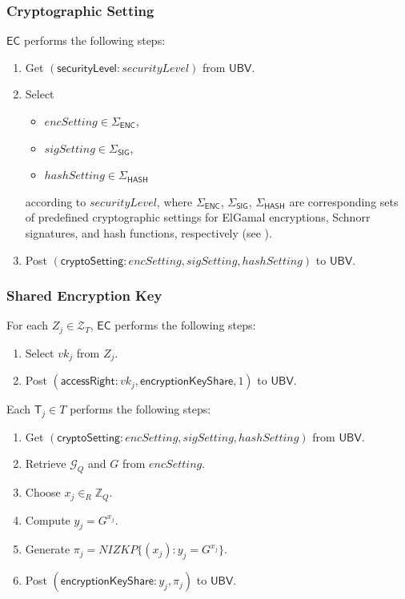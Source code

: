 \documentclass[bibtotoc,halfparskip,oneside]{scrreprt}
\newcommand{\security}{\mathit{securityLevel}\xspace}
\newcommand{\vk}[1]{\mathit{vk}_{#1}\xspace}
\newcommand{\EC}{\ensuremath{\mathsf{EC}}\xspace}
\newcommand{\UBV}{\ensuremath{\mathsf{UBV}}\xspace}
\newcommand{\Tallier}[1]{\ensuremath{\mathsf{T}_{#1}}\xspace}
\begin{document}
\subsubsection{Cryptographic Setting}

\EC performs the following steps:
\begin{enumerate}
	\item Get $(\mathsf{securityLevel}: \security)$ from \UBV.
	\item Select 
	\begin{itemize}
		\item $\mathit{encSetting}\in \Sigma_\mathsf{ENC}$, 
		\item $\mathit{sigSetting}\in \Sigma_\mathsf{SIG}$, 
		\item $\mathit{hashSetting}\in \Sigma_\mathsf{HASH}$ 
	\end{itemize}
	according to $\security$, where $\Sigma_\mathsf{ENC}$, $\Sigma_\mathsf{SIG}$, $\Sigma_\mathsf{HASH}$ are corresponding sets of predefined cryptographic settings for ElGamal encryptions, Schnorr signatures, and hash functions, respectively (see ).
	\item Post $(\mathsf{cryptoSetting}:\mathit{encSetting},\mathit{sigSetting},\mathit{hashSetting})$ to \UBV.	
\end{enumerate}

\subsubsection{Shared Encryption Key}
	
For each $Z_{j}\in \mathcal{Z}_{T}$, \EC performs the following steps:
\begin{enumerate}	
	\item Select $\vk{j}$ from $Z_{j}$.
	\item Post $(\mathsf{accessRight}:\vk{j},\mathsf{encryptionKeyShare},1)$ to \UBV.
\end{enumerate}

Each $\Tallier{j}\in T$ performs the following steps:
\begin{enumerate}[resume]
	\item Get $(\mathsf{cryptoSetting}:\mathit{encSetting},\mathit{sigSetting},\mathit{hashSetting})$ from \UBV.
	\item Retrieve $\mathcal{G}_Q$ and $G$ from $\mathit{encSetting}$.
	\item Choose $x_j\in_R\mathbb{Z}_Q$.
	\item Compute $y_j = G^{x_j}$.
	\item Generate $\pi_{j}=\mathit{NIZKP}\{(x_j):y_j=G^{x_j}\}$.
	\item Post $(\mathsf{encryptionKeyShare}:y_j,\pi_{j})$ to \UBV.
\end{enumerate}
\end{document}
